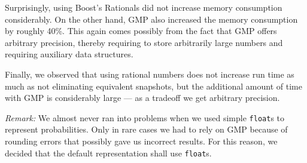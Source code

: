 Surprisingly, using Boost's Rationals did not increase memory consumption considerably. On the other hand, GMP also increased the memory consumption by roughly 40\%. This again comes possibly from the fact that GMP offers arbitrary precision, thereby requiring to store arbitrarily large numbers and requiring auxiliary data structures.

Finally, we observed that using rational numbers does not increase run time as much as not eliminating equivalent snapshots, but the additional amount of time with GMP is considerably large --- as a tradeoff we get arbitrary precision.

\emph{Remark:} We almost never ran into problems when we used simple \texttt{float}s to represent probabilities. Only in rare cases we had to rely on GMP because of rounding errors that possibly gave us incorrect results. For this reason, we decided that the default representation shall use \texttt{float}s.

